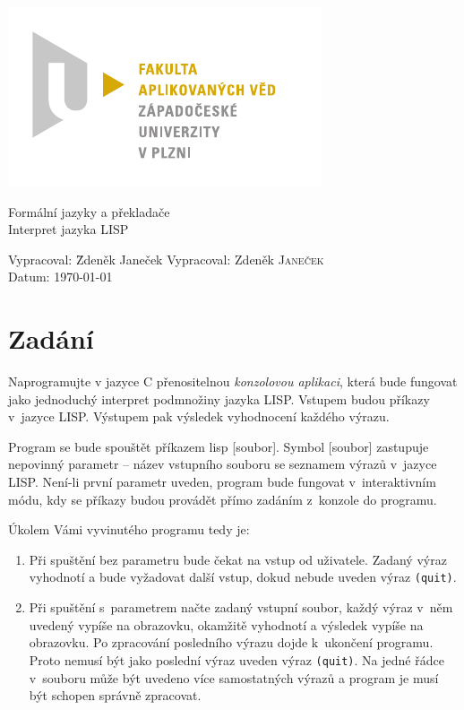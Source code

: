 \documentclass[a4paper, 12pt]{article}
\begin{document}
\begin{titlepage}
\includegraphics{fav_cmyk.pdf}
\vfill
\begin{center}
{\huge Formální jazyky a překladače}\\[3ex]
{\Large Interpret jazyka LISP}
\end{center}
\vfill
\begin{tabbing}
Vypracoval: \hspace{1ex}\=Zdeněk Janeček\kill
Vypracoval: \>Zdeněk \textsc{Janeček}\\[1ex]
Datum:\> \today
\end{tabbing}
\end{titlepage}

\tableofcontents

\section{Zadání}
Naprogramujte v jazyce C přenositelnou \emph{konzolovou aplikaci}, která
bude fungovat jako jednoduchý interpret podmnožiny jazyka LISP.
Vstupem budou příkazy v~jazyce LISP. Výstupem pak výsledek vyhodnocení
každého výrazu.

Program se bude spouštět příkazem \textsf{lisp [soubor]}. Symbol
\textsf{[soubor]} zastupuje nepovinný parametr -- název vstupního
souboru se seznamem výrazů v~jazyce LISP. Není-li první parametr
uveden, program bude fungovat v~interaktivním módu, kdy se příkazy
budou provádět přímo zadáním z~konzole do programu.

Úkolem Vámi vyvinutého programu tedy je:
\begin{enumerate}
\item Při spuštění bez parametru bude čekat na vstup od uživatele.
  Zadaný výraz vyhodnotí a bude vyžadovat další vstup, dokud nebude
  uveden výraz \texttt{(quit)}.
\item Při spuštění s~parametrem načte zadaný vstupní soubor, každý
  výraz v~něm uvedený vypíše na obrazovku, okamžitě vyhodnotí a
  výsledek vypíše na obrazovku. Po zpracování posledního výrazu dojde
  k~ukončení programu. Proto nemusí být jako poslední výraz uveden
  výraz \texttt{(quit)}. Na jedné řádce v~souboru může být uvedeno
  více samostatných výrazů a program je musí být schopen správně
  zpracovat.
\end{enumerate}
\end{document}
